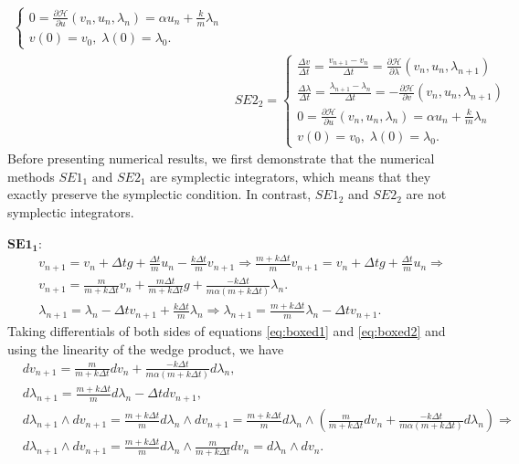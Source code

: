 \documentclass[a4paper, 10pt]{article}
\newcommand{\SEoo}{SE1_1}
\newcommand{\SEot}{SE1_2}
\newcommand{\SEto}{SE2_1}
\newcommand{\SEtt}{SE2_2}
\begin{document}
\begin{equation}
\begin{aligned}
\begin{cases}
          0 =  \frac{\partial \mathcal{H}}{\partial u} (v_n,u_n,\lambda_n) = \alpha u_n + \frac{k}{m}\lambda_n \\
          v(0) = v_0,\; \lambda(0) = \lambda_0.
       \end{cases} \\
       & \SEtt = \begin{cases}
          \frac{\Delta v}{\Delta t} = \frac{v_{n+1} - v_{n}}{\Delta t}= \frac{\partial \mathcal{H}}{\partial \lambda} (v_{n},u_{n},\lambda_{n+1}) \\
          \frac{\Delta \lambda}{\Delta t} =\frac{\lambda_{n+1} - \lambda_{n}}{\Delta t} =  - \frac{\partial \mathcal{H}}{\partial v} (v_{n},u_{n},\lambda_{n+1}) \\
          0 =  \frac{\partial \mathcal{H}}{\partial u} (v_n,u_n,\lambda_n) = \alpha u_n + \frac{k}{m}\lambda_n \\
          v(0) = v_0,\; \lambda(0) = \lambda_0.
       \end{cases}
    \end{aligned}
    \label{eq:equation3}
\end{equation}
Before presenting numerical results, we first demonstrate that the numerical methods $\SEoo$ and $\SEto$ are symplectic integrators, which means that they exactly preserve the symplectic condition. In contrast, $\SEot$ and $\SEtt$ are not symplectic integrators.

$\bm{\SEoo:}$
\begin{align}
&   v_{n+1} = v_{n} +\Delta{t} g + \frac{\Delta t}{m} u_{n} - \frac{k\Delta t}{m}v_{n+1} \Rightarrow
\frac{m+ k \Delta t}{m} v_{n+1} = v_{n} + \Delta{t}g +  \frac{\Delta t}{m} u_{n} \Rightarrow  \nonumber \\ &
\boxed{v_{n+1} = \frac{m}{m + k\Delta{t}} v_{n}  + \frac{m\Delta{t}}{m + k\Delta{t}}g + \frac{-k\Delta{t}}{m\alpha (m+k\Delta{t})} \lambda_{n}.}  \label{eq:boxed1}\\ &
\lambda_{n+1} = \lambda_{n} - \Delta{t}v_{n+1} + \frac{k\Delta{t}}{m}\lambda_{n} \Rightarrow
\boxed{\lambda_{n+1} =\frac{m+k\Delta{t}}{m}\lambda_{n} - \Delta{t} v_{n+1}.} \label{eq:boxed2}
\end{align}
Taking differentials of both sides of equations \eqref{eq:boxed1} and \eqref{eq:boxed2} and using the linearity of the wedge product, we have
\begin{align*}
&   dv_{n+1} = \frac{m}{m + k\Delta{t}} dv_{n} + \frac{-k\Delta{t}}{m\alpha (m+k\Delta{t})} d\lambda_{n}, \\
& d\lambda_{n+1} =\frac{m+k\Delta{t}}{m} d\lambda_{n} - \Delta{t} d v_{n+1}, \\
& d\lambda_{n+1} \wedge dv_{n+1} = \frac{m + k\Delta{t}}{m} d\lambda_{n} \wedge dv_{n+1} =  \frac{m+k\Delta{t}}{m} d\lambda_{n}  \wedge \left(
 \frac{m}{m + k\Delta{t}} dv_{n} + \frac{-k\Delta{t}}{m\alpha (m+k\Delta{t})} d\lambda_{n} \right) \Rightarrow   \\
& \boxed{ d\lambda_{n+1} \wedge dv_{n+1} =  \frac{m+k\Delta{t}}{m} d\lambda_{n}  \wedge  \frac{m}{m + k\Delta{t}} dv_{n}
 =  d\lambda_{n} \wedge dv_{n}}.
\end{align*}
\end{document}
